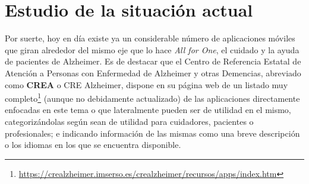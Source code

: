 \section{Estudio de la situación actual}

Por suerte, hoy en día existe ya un considerable número de aplicaciones móviles que giran alrededor del mismo eje que lo hace \emph{All for One}, el cuidado y la ayuda de pacientes de Alzheimer. Es de destacar que el Centro de Referencia Estatal de Atención a Personas con Enfermedad de Alzheimer y otras Demencias, abreviado como \textbf{CREA} o CRE Alzheimer, dispone en su página web de un listado muy completo\footnote{\href{https://crealzheimer.imserso.es/crealzheimer\textunderscore01/recursos/apps/index.htm}{https://crealzheimer.imserso.es/crealzheimer/recursos/apps/index.htm}} (aunque no debidamente actualizado) de las aplicaciones directamente enfocadas en este tema o que lateralmente pueden ser de utilidad en el mismo, categorizándolas según sean de utilidad para cuidadores, pacientes o profesionales; e indicando información de las mismas como una breve descripción o los idiomas en los que se encuentra disponible. 

